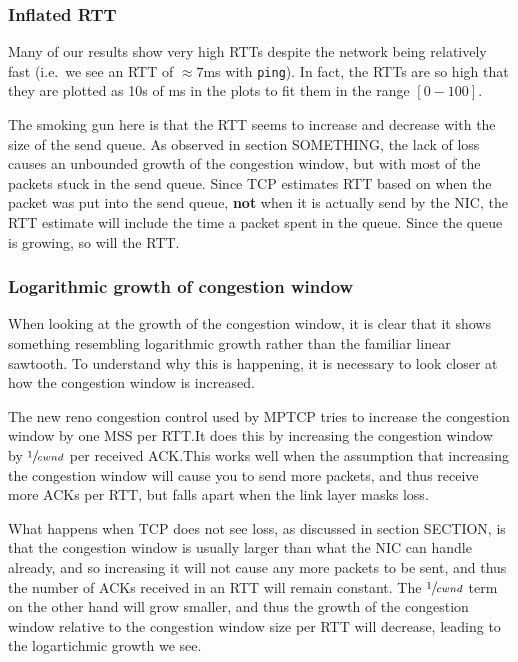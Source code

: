 \documentclass[12pt,a4paper]{article}
\begin{document}
\subsubsection{Inflated RTT}
Many of our results show very high RTTs despite the network being relatively
fast (i.e.\ we see an RTT of $\approx 7$ms with \texttt{ping}). In fact, the
RTTs are so high that they are plotted as 10s of ms in the plots to fit them in
the range $[0-100]$.

The smoking gun here is that the RTT seems to increase and decrease with the
size of the send queue. As observed in section SOMETHING, the lack of loss     %
causes an unbounded growth of the congestion window, but with most of the
packets stuck in the send queue. Since TCP estimates RTT based on when the
packet was put into the send queue, \textbf{not} when it is actually send by the
NIC, the RTT estimate will include the time a packet spent in the queue. Since
the queue is growing, so will the RTT.

\subsubsection{Logarithmic growth of congestion window}
When looking at the growth of the congestion window, it is clear that it shows
something resembling logarithmic growth rather than the familiar linear
sawtooth. To understand why this is happening, it is necessary to look closer at
how the congestion window is increased.

The new reno congestion control used by MPTCP tries to increase the congestion
window by one MSS per RTT.\@ It does this by increasing the congestion window by
$\sfrac{1}{cwnd}$ per received ACK.\@ This works well when the assumption that
increasing the congestion window will cause you to send more packets, and thus
receive more ACKs per RTT, but falls apart when the link layer masks loss.

What happens when TCP does not see loss, as discussed in section SECTION, is   %
that the congestion window is usually larger than what the NIC can handle
already, and so increasing it will not cause any more packets to be sent, and
thus the number of ACKs received in an RTT will remain constant. The
$\sfrac{1}{cwnd}$ term on the other hand will grow smaller, and thus the growth
of the congestion window relative to the congestion window size per RTT will
decrease, leading to the logartichmic growth we see.
\end{document}
